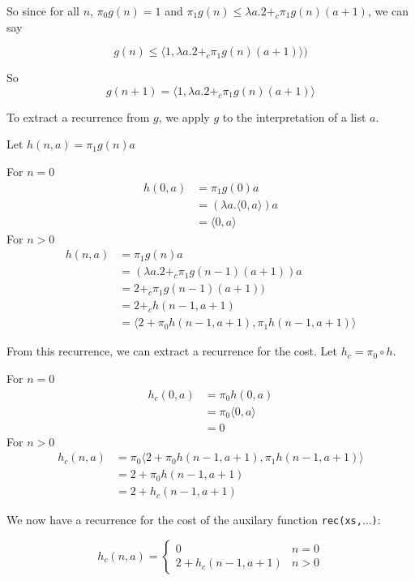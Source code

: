 \documentclass[12pt,letterpaper]{article}
\begin{document}
So since for all $n$, $\pi_0 g(n) = 1$ and $\pi_1 g(n) \leq \lambda a. 2 +_c \pi_1 g(n) (a+1)$, we can say

\[ g(n) \leq \langle 1, \lambda a. 2 +_c \pi_1g(n) (a+1)\rangle) \]

So 
\[ g(n+1) = \langle 1, \lambda a. 2 +_c \pi_1g(n) (a+1)\rangle\]


To extract a recurrence from $g$, we apply $g$ to the interpretation of a list $a$.

Let $h(n,a) = \pi_1 g(n) a$

For $n=0$
\begin{align*}
h(0,a) &= \pi_1 g(0) a \\
&= (\lambda a.\langle 0,a\rangle) a \\
&= \langle 0, a\rangle
\end{align*}
For $n>0$
\begin{align*}
h(n,a) &= \pi_1 g(n) a \\ 
&= (\lambda a. 2 +_c \pi_1g(n-1) (a+1)) a \\
&= 2 +_c \pi_1 g(n-1) (a+1)) \\
&= 2 +_c h(n-1,a+1) \\
&= \langle 2 + \pi_0 h(n-1,a+1), \pi_1 h(n-1,a+1)\rangle
\end{align*}

From this recurrence, we can extract a recurrence for the cost. Let $h_c = \pi_0 \circ h$.

For $n=0$
\begin{align*}
h_c(0,a) &= \pi_0 h(0,a)\\
&= \pi_0 \langle 0, a\rangle\\
&= 0
\end{align*}
For $n>0$
\begin{align*}
h_c(n,a) &= \pi_0 \langle 2 + \pi_0 h(n-1,a+1), \pi_1 h(n-1,a+1)\rangle\\
&= 2 + \pi_0 h(n-1,a+1)\\
&= 2 + h_c(n-1,a+1)
\end{align*}

We now have a recurrence for the cost of the auxilary function \texttt{rec(xs,$\dots$)}:
\begin{framed}
  \begin{equation}
    h_c(n,a) = \begin{cases}
      0 & n = 0 \\
      2 + h_c(n-1,a+1) & n > 0
    \end{cases}
  \end{equation}
\end{framed}
\end{document}
